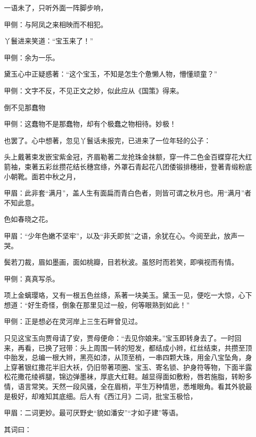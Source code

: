 \begin{parag}
    一语未了，只听外面一阵脚步响，\begin{note}甲侧：与阿凤之来相映而不相犯。\end{note}丫鬟进来笑道：“宝玉来了！”\begin{note}甲侧：余为一乐。\end{note}黛玉心中正疑惑著：“这个宝玉，不知是怎生个惫懒人物，懵懂顽童？”\begin{note}甲侧：文字不反，不见正文之妙，似此应从《国策》得来。\end{note}倒不见那蠢物\begin{note}甲侧：这蠢物不是那蠢物，却有个极蠢之物相待。妙极！\end{note}也罢了。心中想著，忽见丫鬟话未报完，已进来了一位年轻的公子：
\end{parag}


\begin{qute2sp}
    头上戴著束发嵌宝紫金冠，齐眉勒著二龙抢珠金抹额，穿一件二色金百蝶穿花大红箭袖，束著五彩丝攒花结长穗宫绦，外罩石青起花八团倭锻排穗褂，登著青缎粉底小朝靴。面若中秋之月，\begin{note}甲眉：此非套“满月”，盖人生有面扁而青白色者，则皆可谓之秋月也。用“满月”者不知此意。\end{note}色如春晓之花。\begin{note}甲眉：“少年色嫩不坚牢”，以及“非夭即贫”之语，余犹在心。今阅至此，放声一哭。\end{note}鬓若刀裁，眉如墨画，面如桃瓣，目若秋波。虽怒时而若笑，即嗔视而有情。
\end{qute2sp}


\begin{parag}
    \begin{note}甲侧：真真写杀。\end{note}项上金螭璎珞，又有一根五色丝绦，系著一块美玉。黛玉一见，便吃一大惊，心下想道：“好生奇怪，倒象在那里见过一般，何等眼熟到如此！”\begin{note}甲侧：正是想必在灵河岸上三生石畔曾见过。\end{note}只见这宝玉向贾母请了安，贾母便命：“去见你娘来。”宝玉即转身去了。一时回来，再看，已换了冠带：头上周围一转的短发，都结成小辫，红丝结束，共攒至顶中胎发，总编一根大辫，黑亮如漆，从顶至梢，一串四颗大珠，用金八宝坠角，身上穿著银红撒花半旧大袄，仍旧带著项圈、宝玉、寄名锁、护身符等物，下面半露松花撒花绫裤腿，锦边弹墨袜，厚底大红鞋。越显得面如敷粉，唇若施脂，转盼多情，语言常笑。天然一段风骚，全在眉梢，平生万种情思，悉堆眼角。看其外貌最是极好，却难知其底细。后人有《西江月》二词，批宝玉极恰，\begin{note}甲眉：二词更妙。最可厌野史“貌如潘安”“才如子建”等语。\end{note}其词曰：
\end{parag}


